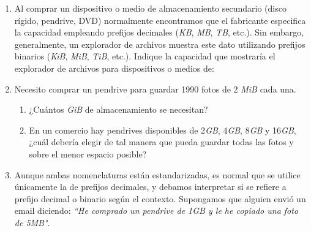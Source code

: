 \documentclass[12pt]{article}
\begin{document}
    \begin{enumerate}

        \item Al comprar un dispositivo o medio de almacenamiento secundario
            (disco rígido, pendrive, DVD) normalmente encontramos que el
            fabricante especifica la capacidad empleando prefijos decimales
            (\emph{KB}, \emph{MB}, \emph{TB}, etc.). Sin embargo,
            generalmente, un explorador de archivos muestra este dato
            utilizando prefijos binarios (\emph{KiB}, \emph{MiB}, \emph{TiB},
            etc.). Indique la capacidad que mostraría el explorador de
            archivos para dispositivos o medios de:


    \item Necesito comprar un pendrive para guardar 1990 fotos de 2 \emph{MiB}
        cada una.

        \begin{enumerate}

            \item ¿Cuántos \emph{GiB} de almacenamiento se necesitan?

            \item En un comercio hay pendrives disponibles de 2\emph{GB},
                4\emph{GB}, 8\emph{GB} y 16\emph{GB}, ¿cuál debería elegir de
                tal manera que pueda guardar todas las fotos y sobre el menor
                espacio posible?

        \end{enumerate}

    \item Aunque ambas nomenclaturas están estandarizadas, es normal que se
        utilice únicamente la de prefijos decimales, y debamos interpretar si
            se refiere a prefijo decimal o binario según el contexto.
            Supongamos que alguien envió un email diciendo: \emph{``He
            comprado un pendrive de 1GB y le he copiado una foto de 5MB"}.


\end{enumerate}
\end{document}
